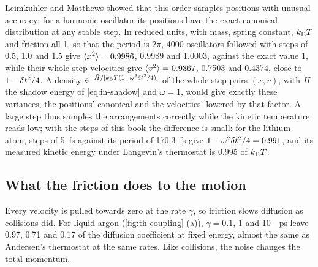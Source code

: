 \noindent Leimkuhler and Matthews showed that this order samples
positions with unusual accuracy; for a harmonic oscillator its positions
have the exact canonical distribution at any stable step. In reduced
units, with mass, spring constant, $k_{\mathrm{B}} T$ and friction all 1, so that
the period is $2\pi$, \num{4000} oscillators followed with steps of 0.5,
1.0 and 1.5 give $\langle x^2 \rangle = 0.9986$, 0.9989 and 1.0003, against the
exact value 1, while their whole-step velocities give $\langle v^2 \rangle =
0.9367$, 0.7503 and 0.4374, close to $1 - \delta t^2/4$. A density
$\mathrm{e}^{-\tilde H/[k_{\mathrm{B}} T(1 - \omega^2\delta t^2/4)]}$ of the whole-step
pairs $(x, v)$, with $\tilde H$ the shadow energy of \cref{eq:in-shadow}
and $\omega = 1$, would give exactly these variances, the positions'
canonical and the velocities' lowered by that factor. A large step thus
samples the arrangements correctly while the kinetic temperature reads
low; with the steps of this book the difference is small: for the
lithium atom, steps of \SI{5}{\femto\second} against its period of
\SI{170.3}{\femto\second} give $1 - \omega^2\delta t^2/4 = 0.991$, and its
measured kinetic energy under Langevin's thermostat is 0.995 of $k_{\mathrm{B}} T$.

\subsection*{What the friction does to the motion}

Every velocity is pulled towards zero at the rate $\gamma$, so friction
slows diffusion as collisions did. For liquid argon (\cref{fig:th-coupling}
(a)), $\gamma = 0.1$, 1 and \SI{10}{\per\pico\second} leave 0.97, 0.71 and
0.17 of the diffusion coefficient at fixed energy, almost the same as
Andersen's thermostat at the same rates. Like collisions, the noise
changes the total momentum.

